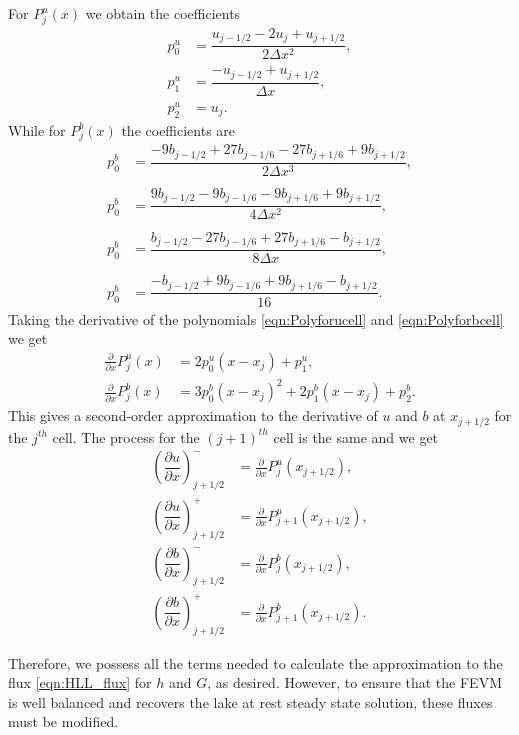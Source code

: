 For $P^u_j(x)$ we obtain the coefficients
\begin{align*}
p^u_0 &=  \dfrac{u_{j-1/2} - 2u_j + u_{j+1/2}}{2 \Delta x^2},\\
p^u_1 &=  \dfrac{-u_{j-1/2} + u_{j+1/2}}{\Delta x},\\
p^u_2 &=  u_j.
\end{align*}
While for $P^b_j(x)$ the coefficients are
\begin{align*}
p^b_0 &=  \dfrac{-9b_{j-1/2} + 27b_{j-1/6} - 27 b_{j+1/6} + 9b_{j+1/2}}{2 \Delta x^3},\\ \\
p^b_0 &=  \dfrac{9b_{j-1/2} - 9b_{j-1/6} - 9b_{j+1/6} + 9b_{j+1/2}}{4 \Delta x^2},\\ \\ 
p^b_0 &=  \dfrac{b_{j-1/2} - 27b_{j-1/6} + 27 b_{j+1/6} - b_{j+1/2}}{8 \Delta x},\\\\
p^b_0 &=  \dfrac{-b_{j-1/2}  + 9b_{j-1/6} + 9 b_{j+1/6} - b_{j+1/2}}{16}.
\end{align*}
Taking the derivative of the polynomials \eqref{eqn:Polyforucell} and \eqref{eqn:Polyforbcell} we get
	\begin{align*}
	\frac{\partial }{\partial x}P^u_j(x) &= 2p^u_0 \left(x - x_j\right) + p^u_1, \\
	\frac{\partial }{\partial x}P^b_j(x) &= 3p^b_0 \left(x - x_j\right)^2 + 2p^b_1 \left(x - x_j\right) + p^b_2.
	\end{align*}
This gives a second-order approximation to the derivative of $u$ and $b$ at $x_{j+1/2}$ for the $j^{th}$ cell. The process for the $(j+1)^{th}$ cell is the same and we get 
	\begin{align*}
	\left(\dfrac{\partial {u}}{\partial x} \right)^-_{j + 1/2} &= \frac{\partial }{\partial x}P^u_j(x_{j+1/2}),  \\
	\left(\dfrac{\partial {u}}{\partial x} \right)^+_{j + 1/2} &= \frac{\partial }{\partial x}P^u_{j+1}(x_{j+1/2}),  \\
	\left(\dfrac{\partial {b}}{\partial x} \right)^-_{j + 1/2} &= \frac{\partial }{\partial x}P^b_j(x_{j+1/2}), \\
	\left(\dfrac{\partial {b}}{\partial x} \right)^+_{j + 1/2} &= \frac{\partial }{\partial x}P^b_{j+1}(x_{j+1/2}). 	\end{align*}

Therefore, we possess all the terms needed to calculate the approximation to the flux \eqref{eqn:HLL_flux} for $h$ and $G$, as desired. However, to ensure that the FEVM is well balanced and recovers the lake at rest steady state solution, these fluxes must be modified.


